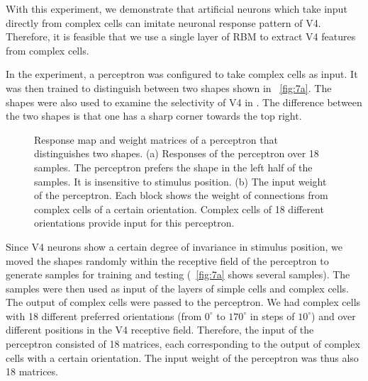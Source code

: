 \documentclass[twocolumn]{article}
\begin{document}
With this experiment, we demonstrate that artificial neurons which take input directly from complex cells can imitate neuronal response pattern of V4.
Therefore, it is feasible that we use a single layer of RBM to extract V4 features from complex cells.

In the experiment, a perceptron was configured to take complex cells as input.
It was then trained to distinguish between two shapes shown in \figurename~\ref{fig:7a}.
The shapes were also used to examine the selectivity of V4 in \cite{pasupathy2001}.
The difference between the two shapes is that one has a sharp corner towards the top right.

\begin{figure}[!t]
\centering
{}\hfil
{}
\caption{Response map and weight matrices of a perceptron that distinguishes two shapes.
(a) Responses of the perceptron over 18 samples.
The perceptron prefers the shape in the left half of the samples.
It is insensitive to stimulus position.
(b) The input weight of the perceptron. 
Each block shows the weight of connections from complex cells of a certain orientation.
Complex cells of 18 different orientations provide input for this perceptron.}
\label{fig:7}
\end{figure}

Since V4 neurons show a certain degree of invariance in stimulus position,
we moved the shapes randomly within the receptive field of the perceptron 
to generate samples for training and testing (\figurename~\ref{fig:7a} shows several samples).
The samples were then used as input of the layers of simple cells and complex cells.
The output of complex cells were passed to the perceptron.
We had complex cells with 18 different preferred orientations (from $0^\circ$ to $170^\circ$ in steps of $10^\circ$) 
and over different positions in the V4 receptive field.
Therefore, the input of the perceptron consisted of 18 matrices, 
each corresponding to the output of complex cells with a certain orientation.
The input weight of the perceptron was thus also 18 matrices.
\end{document}
